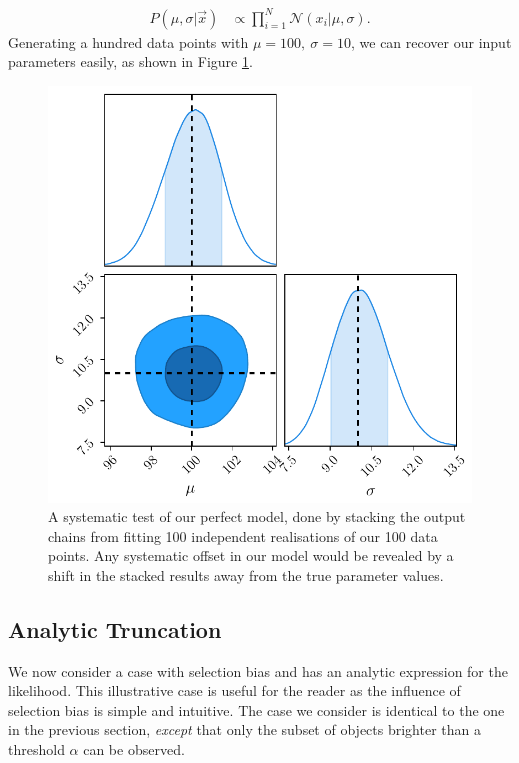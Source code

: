 \documentclass[a4paper,fleqn,usenatbib]{mnras}
\begin{document}
\begin{align}
P(\mu,\sigma| \vec{x}) &\propto \prod_{i=1}^N \mathcal{N}(x_i | \mu, \sigma). \label{eq:prod}
\end{align}
Generating a hundred data points with $\mu=100,\ \sigma=10$, we can recover our input parameters easily, as shown in Figure \ref{fig:perfect}.
\begin{figure}
	\begin{center}
		\includegraphics[width=\columnwidth]{example/perfect.pdf}
	\end{center}
	\caption{A systematic test of our perfect model, done by stacking the output chains from fitting 100 independent realisations of our 100 data points. Any systematic offset in our model would be revealed by a shift in the stacked results away from the true parameter values.}
	\label{fig:perfect}
\end{figure}










\subsection{Analytic Truncation}
\label{sec:imperfect}

We now consider a case with selection bias and has an analytic expression for the likelihood.  This illustrative case is useful for the reader as the influence of selection bias is simple and intuitive. The case we consider is identical to the one in the previous section, \textit{except} that only the subset of objects brighter than a threshold $\alpha$ can be observed.
\end{document}

